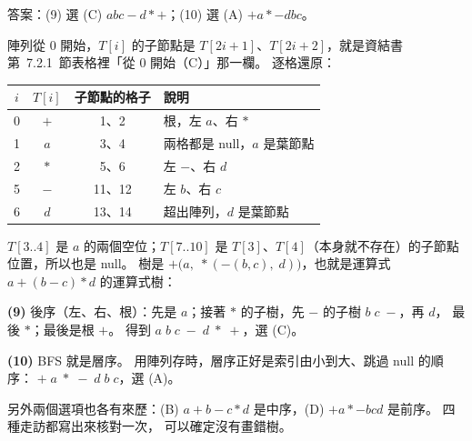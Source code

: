 \begin{pastsoln}
答案：(9) 選 (C) $abc-d*+$；(10) 選 (A) $+a*-dbc$。

陣列從 $0$ 開始，$T[i]$ 的子節點是 $T[2i + 1]$、$T[2i + 2]$，就是資結書第~7.2.1~節表格裡「從
$0$ 開始（C）」那一欄。 逐格還原：
\begin{center}
\small
\begin{tabular}{cccl}
\toprule
$i$ & $T[i]$ & 子節點的格子 & 說明 \\
\midrule
0 & $+$ & 1、2 & 根，左 $a$、右 $*$ \\
1 & $a$ & 3、4 & 兩格都是 null，$a$ 是葉節點 \\
2 & $*$ & 5、6 & 左 $-$、右 $d$ \\
5 & $-$ & 11、12 & 左 $b$、右 $c$ \\
6 & $d$ & 13、14 & 超出陣列，$d$ 是葉節點 \\
\bottomrule
\end{tabular}
\end{center}
$T[3..4]$ 是 $a$ 的兩個空位；$T[7..10]$ 是 $T[3]$、$T[4]$（本身就不存在）的子節點位置，所以也是
null。 樹是 $+\bigl(a,\; *(-(b, c),\; d)\bigr)$，也就是運算式 $a + (b - c) * d$ 的運算式樹：

\begin{center}
\end{center}

\textbf{(9)} 後序（左、右、根）：先是 $a$；接著 $*$ 的子樹，先 $-$ 的子樹 $b\;c\;-$，再 $d$，
最後 $*$；最後是根 $+$。 得到 $a\;b\;c\;-\;d\;*\;+$，選 (C)。

\textbf{(10)} BFS 就是層序。 用陣列存時，層序正好是索引由小到大、跳過 null 的順序：
$+\;a\;*\;-\;d\;b\;c$，選 (A)。

另外兩個選項也各有來歷：(B) $a+b-c*d$ 是中序，(D) $+a*-bcd$ 是前序。 四種走訪都寫出來核對一次，
可以確定沒有畫錯樹。
\end{pastsoln}
